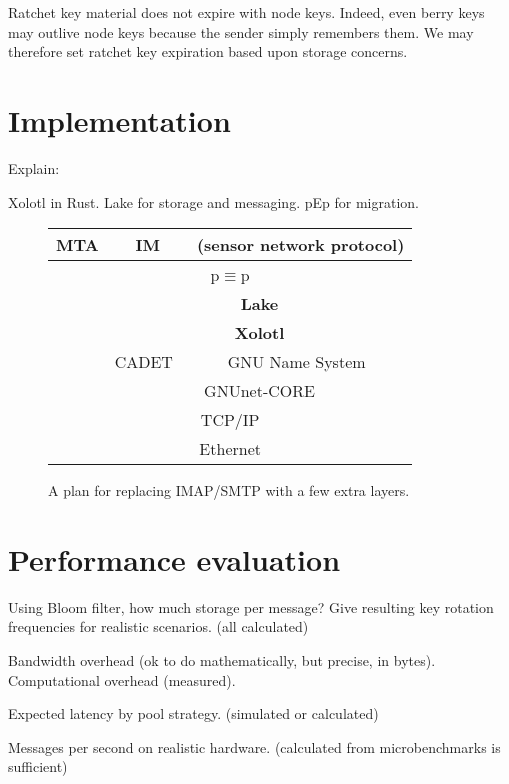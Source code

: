 \documentclass[twoside,letterpaper]{llncs}
\begin{document}
Ratchet key material does not expire with node keys.  Indeed, even
berry keys may outlive node keys because the sender simply remembers
them.  We may therefore set ratchet key expiration based upon storage
concerns. 


\section{Implementation}

Explain:

Xolotl in Rust.
Lake for storage and messaging.
pEp for migration.

\begin{figure}
\begin{center}
\begin{tabular}{|c|c|c|} \hline
   MTA & IM & (sensor network protocol) \\ \hline
   \multicolumn{3}{|c|}{{p$\equiv$p}}  \\ \hline
   & \multicolumn{2}{|c|}{{\bf Lake}}   \\ \cline{2-3}
   & \multicolumn{2}{|c|}{{\bf Xolotl}} \\ \cline{2-3}
   \raisebox{1.5ex}{SMTP} & CADET~\cite{cadet} & GNU Name System~\cite{gns}  \\ \cline{2-3}
   & \multicolumn{2}{|c|}{GNUnet-CORE}  \\ \hline
   \multicolumn{3}{|c|}{TCP/IP}       \\ \hline
   \multicolumn{3}{|c|}{Ethernet}     \\ \hline
\end{tabular}
\end{center}
\caption{A plan for replacing IMAP/SMTP with a few extra layers.}
\label{fig:layers}
\end{figure}


\section{Performance evaluation}

Using Bloom filter, how much storage per message?
Give resulting key rotation frequencies for realistic
scenarios. (all calculated)

Bandwidth overhead (ok to do mathematically, but precise,
in bytes).  Computational overhead (measured).

Expected latency by pool strategy. (simulated or calculated)

Messages per second on realistic hardware. (calculated from
microbenchmarks is sufficient)
\end{document}
